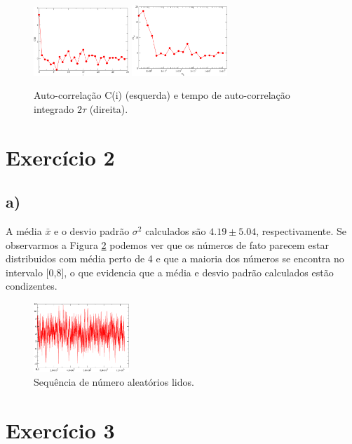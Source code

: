 \documentclass[a4wide]{report}
\begin{document}
\begin{figure}[!htb]
\centering
\includegraphics[width=0.32\textwidth]{Ci.pdf}
\includegraphics[width=0.32\textwidth]{tau.pdf}
\caption{Auto-correlação C(i) (esquerda) e tempo de auto-correlação integrado $2\tau$ (direita).}
\label{1c}
\end{figure}


\section*{Exercício 2}

\subsection*{a)}
A média $\bar{x}$ e o desvio padrão $\sigma^2$ calculados são $4.19 \pm 5.04$, respectivamente. Se observarmos a Figura \ref{2a} podemos ver que os números de fato parecem estar distribuidos com média perto de 4 e que a maioria dos números se encontra no intervalo [0,8], o que evidencia que a média e desvio padrão calculados estão condizentes.

\begin{figure}[!htb]
\centering
\includegraphics[width=0.32\textwidth]{saida.pdf}
\caption{Sequência de número aleatórios lidos.}
\label{2a}
\end{figure}


\section*{Exercício 3}
\end{document}
